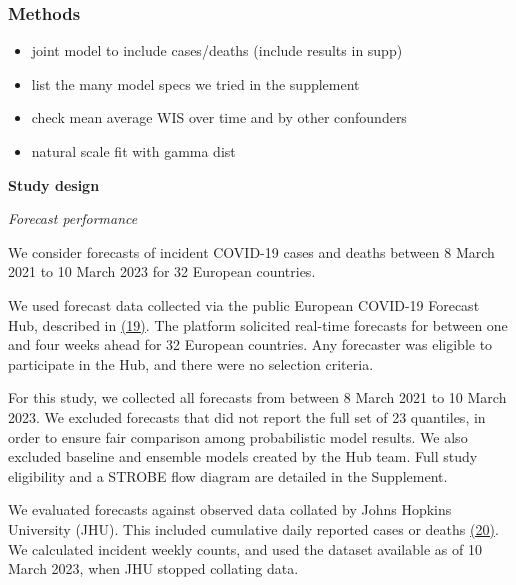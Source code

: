 \documentclass[
  letterpaper,
  DIV=11,
  numbers=noendperiod]{scrartcl}
\providecommand{\tightlist}{%
  \setlength{\itemsep}{0pt}\setlength{\parskip}{0pt}}
\begin{document}
\subsubsection{Methods}\label{methods}

\begin{tcolorbox}[enhanced jigsaw, title=\textcolor{quarto-callout-caution-color}{\faFire}\hspace{0.5em}{TODO}, coltitle=black, colback=white, left=2mm, colbacktitle=quarto-callout-caution-color!10!white, breakable, bottomrule=.15mm, titlerule=0mm, opacityback=0, toprule=.15mm, rightrule=.15mm, arc=.35mm, toptitle=1mm, leftrule=.75mm, bottomtitle=1mm, opacitybacktitle=0.6, colframe=quarto-callout-caution-color-frame]

\begin{itemize}
\tightlist
\item[$\square$]
  joint model to include cases/deaths (include results in supp)
\item[$\square$]
  list the many model specs we tried in the supplement
\item[$\square$]
  check mean average WIS over time and by other confounders
\item[$\square$]
  natural scale fit with gamma dist
\end{itemize}

\end{tcolorbox}

\textbf{Study design}

\emph{Forecast performance}

We consider forecasts of incident COVID-19 cases and deaths between 8
March 2021 to 10 March 2023 for 32 European countries.

We used forecast data collected via the public European COVID-19
Forecast Hub, described in
\href{https://www.zotero.org/google-docs/?5K4uXI}{(19)}. The platform
solicited real-time forecasts for between one and four weeks ahead for
32 European countries. Any forecaster was eligible to participate in the
Hub, and there were no selection criteria.

For this study, we collected all forecasts from between 8 March 2021 to
10 March 2023. We excluded forecasts that did not report the full set of
23 quantiles, in order to ensure fair comparison among probabilistic
model results. We also excluded baseline and ensemble models created by
the Hub team. Full study eligibility and a STROBE flow diagram are
detailed in the Supplement.

We evaluated forecasts against observed data collated by Johns Hopkins
University (JHU). This included cumulative daily reported cases or
deaths \href{https://www.zotero.org/google-docs/?cDnqeb}{(20)}. We
calculated incident weekly counts, and used the dataset available as of
10 March 2023, when JHU stopped collating data.
\end{document}
